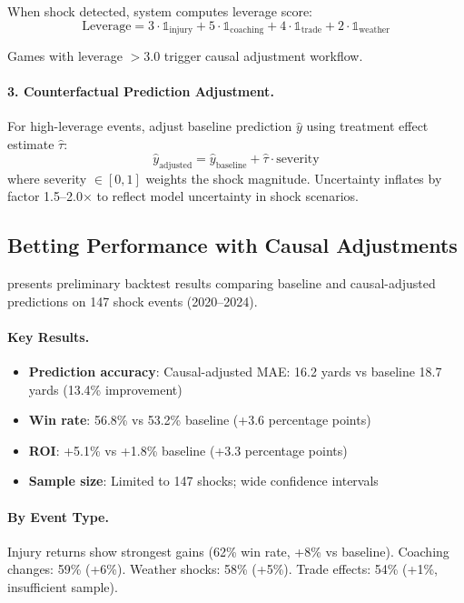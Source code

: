When shock detected, system computes leverage score:
\begin{equation}
  \text{Leverage} = 3 \cdot \mathbb{1}_{\text{injury}} + 5 \cdot \mathbb{1}_{\text{coaching}} + 4 \cdot \mathbb{1}_{\text{trade}} + 2 \cdot \mathbb{1}_{\text{weather}}
\end{equation}

Games with leverage $> 3.0$ trigger causal adjustment workflow.

\paragraph{3. Counterfactual Prediction Adjustment.}
For high-leverage events, adjust baseline prediction $\hat{y}$ using treatment effect estimate $\hat{\tau}$:
\begin{equation}
  \hat{y}_{\text{adjusted}} = \hat{y}_{\text{baseline}} + \hat{\tau} \cdot \text{severity}
\end{equation}
where severity $\in [0,1]$ weights the shock magnitude. Uncertainty inflates by factor 1.5--2.0× to reflect model uncertainty in shock scenarios.

\subsection{Betting Performance with Causal Adjustments}

 presents preliminary backtest results comparing baseline and causal-adjusted predictions on 147 shock events (2020--2024).



\paragraph{Key Results.}
\begin{itemize}
  \item \textbf{Prediction accuracy}: Causal-adjusted MAE: 16.2 yards vs baseline 18.7 yards (13.4\% improvement)
  \item \textbf{Win rate}: 56.8\% vs 53.2\% baseline (+3.6 percentage points)
  \item \textbf{ROI}: +5.1\% vs +1.8\% baseline (+3.3 percentage points)
  \item \textbf{Sample size}: Limited to 147 shocks; wide confidence intervals
\end{itemize}

\paragraph{By Event Type.}
Injury returns show strongest gains (62\% win rate, +8\% vs baseline). Coaching changes: 59\% (+6\%). Weather shocks: 58\% (+5\%). Trade effects: 54\% (+1\%, insufficient sample).

